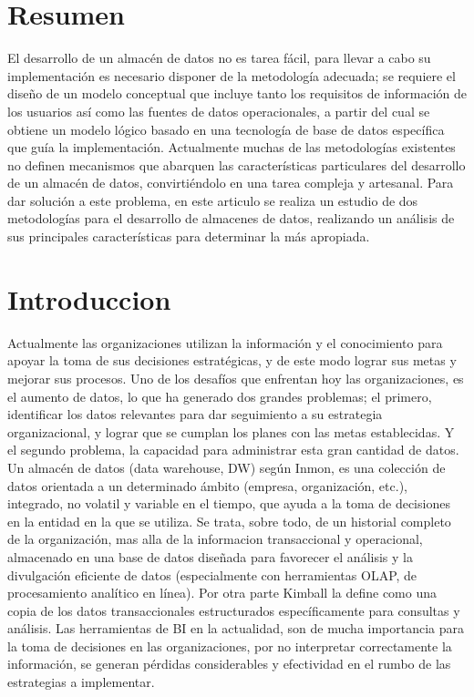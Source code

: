 \documentclass[preprint,12pt]{elsarticle}
\begin{document}
	\section{Resumen}
El desarrollo de un almacén de datos no es tarea fácil, para llevar a cabo su implementación es necesario disponer de la metodología adecuada; se requiere el diseño de un modelo conceptual que incluye tanto los requisitos de información de los usuarios así como las fuentes de datos operacionales, a partir del cual se obtiene un modelo lógico basado en una tecnología de base de datos específica que guía la implementación. Actualmente muchas de las metodologías existentes no definen mecanismos que abarquen las características particulares del desarrollo de un almacén de datos, convirtiéndolo en una tarea compleja y artesanal. Para dar solución a este problema, en este articulo se realiza un estudio de dos metodologías para el desarrollo de almacenes de datos, realizando un análisis de sus principales características para determinar la más apropiada.

\section{Introduccion}
Actualmente las organizaciones utilizan la información y el conocimiento para apoyar la toma de sus decisiones estratégicas, y de este modo lograr sus metas y mejorar sus procesos.
Uno de los desafíos que enfrentan hoy las organizaciones, es el aumento de datos, lo que ha generado dos grandes problemas; el primero, identificar los datos relevantes para dar seguimiento a su estrategia organizacional, y lograr que se cumplan los planes con las metas establecidas. Y el segundo problema, la capacidad para administrar esta gran cantidad de datos.
Un almacén de datos (data warehouse, DW) según Inmon, es una colección de datos orientada a un determinado ámbito (empresa, organización, etc.), integrado, no volatil y variable en el tiempo, que ayuda a la toma de decisiones en la entidad en la que se utiliza. Se trata, sobre todo, de un historial completo de la organización, mas alla de la informacion transaccional y operacional, almacenado en una base de datos diseñada para favorecer el análisis y la divulgación eficiente de datos (especialmente con herramientas OLAP, de procesamiento analítico en línea). Por otra parte Kimball la define como una copia de los datos transaccionales estructurados específicamente para consultas y análisis. 
Las herramientas de BI en la actualidad, son de mucha importancia para la toma de decisiones en las organizaciones, por no interpretar correctamente la información, se generan pérdidas considerables y efectividad en el rumbo de las estrategias a implementar.
\end{document}
